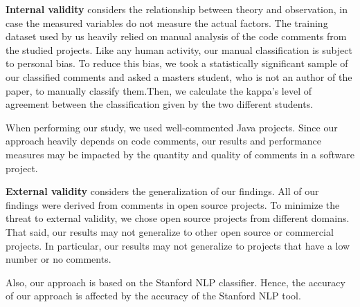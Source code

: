 \noindent\textbf{Internal validity} considers the relationship between theory and observation, in case the measured variables do not measure the actual factors. The training dataset used by us heavily relied on manual analysis of the code comments from the studied projects. Like any human activity, our manual classification is subject to personal bias. To reduce this bias, we took a statistically significant sample of our classified comments and asked a masters student, who is not an author of the paper, to manually classify them.Then, we calculate the kappa's level of agreement between the classification given by the two different students.    

When performing our study, we used well-commented Java projects. Since our approach heavily depends on code comments, our results and performance measures may be impacted by the quantity and quality of comments in a software project.   


\noindent \textbf{External validity} considers the generalization of our findings. All of our findings were derived from comments in open source projects. To minimize the threat to external validity, we chose open source projects from different domains. That said, our results may not generalize to other open source or commercial projects. In particular, our results may not generalize to projects that have a low number or no comments.

Also, our approach is based on the Stanford NLP classifier. Hence, the accuracy of our approach is affected by the accuracy of the Stanford NLP tool. 